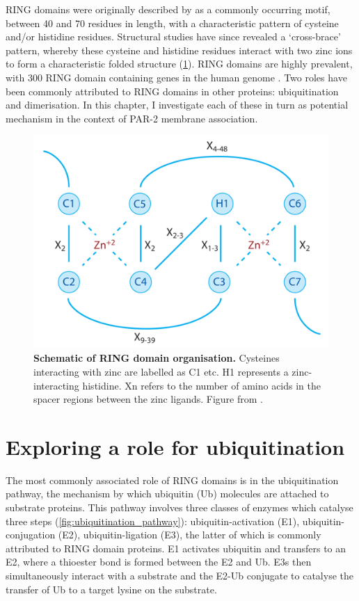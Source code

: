 \documentclass[12pt]{"report"}
\newcommand{\mycaption}[2]{\caption[#1]{\textbf{#1.} #2}}
\begin{document}
RING domains were originally described by \textcite{Freemont1991} as a commonly occurring motif, between 40 and 70 residues in length, with a characteristic pattern of cysteine and/or histidine residues. Structural studies have since revealed a ‘cross-brace’ pattern, whereby these cysteine and histidine residues interact with two zinc ions to form a characteristic folded structure (\cref{fig:ring_schematic}). RING domains are highly prevalent, with 300 RING domain containing genes in the human genome \citep{Li2008}. Two roles have been commonly attributed to RING domains in other proteins: ubiquitination and dimerisation. In this chapter, I investigate each of these in turn as potential mechanism in the context of PAR-2 membrane association.\\

\begin{figure}
\includegraphics[scale=0.4]{ring_schematic}
\mycaption{Schematic of RING domain organisation}{
Cysteines interacting with zinc are labelled as C1 etc. H1 represents a zinc-interacting histidine. Xn refers to the number of amino acids in the spacer regions between the zinc ligands. Figure from \textcite{Deshaies2009}.
}
\label{fig:ring_schematic}
\end{figure}


\section{Exploring a role for ubiquitination}

The most commonly associated role of RING domains is in the ubiquitination pathway, the mechanism by which ubiquitin (Ub) molecules are attached to substrate proteins. This pathway involves three classes of enzymes which catalyse three steps (\cref{fig:ubiquitination_pathway}): ubiquitin-activation (E1), ubiquitin-conjugation (E2), ubiquitin-ligation (E3), the latter of which is commonly attributed to RING domain proteins. E1 activates ubiquitin and transfers to an E2, where a thioester bond is formed between the E2 and Ub. E3s then simultaneously interact with a substrate and the E2-Ub conjugate to catalyse the transfer of Ub to a target lysine on the substrate. \\
\end{document}
